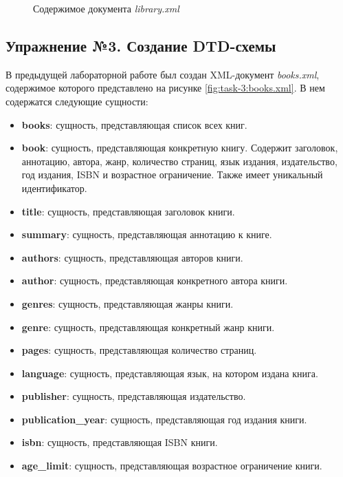 \documentclass[a4paper, 14pt]{extarticle}
\begin{document}
\inputminted{xml}{../code/task-2/library.xml}
\begin{figure}[H]
  \centering
  \caption{Содержимое документа \textit{library.xml}}
  \label{fig:task-2:library.xml}
\end{figure}

\subsection*{Упражнение №3. Создание DTD-схемы}

В предыдущей лабораторной работе был создан XML-документ
\textit{\foreignlanguage{english}{books.xml}}, содержимое которого представлено
на рисунке \ref{fig:task-3:books.xml}. В нем содержатся следующие сущности:
\begin{itemize}
  \item \textbf{books}: сущность, представляющая список всех книг.
  \item \textbf{book}: сущность, представляющая конкретную книгу. Содержит
  заголовок, аннотацию, автора, жанр, количество страниц, язык издания,
  издательство, год издания, ISBN и возрастное ограничение. Также имеет
  уникальный идентификатор.
  \item \textbf{title}: сущность, представляющая заголовок книги.
  \item \textbf{summary}: сущность, представляющая аннотацию к книге.
  \item \textbf{authors}: сущность, представляющая авторов книги.
  \item \textbf{author}: сущность, представляющая конкретного автора книги.
  \item \textbf{genres}: сущность, представляющая жанры книги.
  \item \textbf{genre}: сущность, представляющая конкретный жанр книги.
  \item \textbf{pages}: сущность, представляющая количество страниц.
  \item \textbf{language}: сущность, представляющая язык, на котором издана
  книга.
  \item \textbf{publisher}: сущность, представляющая издательство.
  \item \textbf{publication\_year}: сущность, представляющая год издания книги.
  \item \textbf{isbn}: сущность, представляющая ISBN книги.
  \item \textbf{age\_limit}: сущность, представляющая возрастное ограничение
  книги.
\end{itemize}
\end{document}
